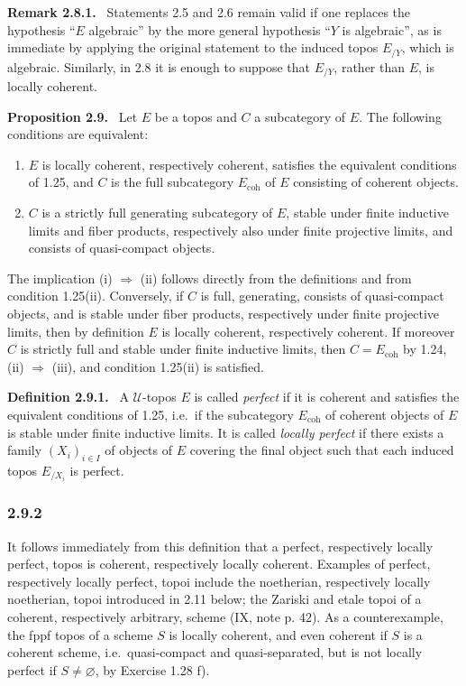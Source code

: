 \documentclass[11pt]{article}
\newcommand{\U}{\mathcal{U}}
\newcommand{\coh}{\mathrm{coh}}
\newcommand{\ie}{i.e.\ }
\newenvironment{statement}[1]{\par\medskip\noindent\textbf{#1.}\ }{\par\medskip}
\newenvironment{remarktext}[1]{\par\medskip\noindent\textbf{#1.}\ }{\par\medskip}
\begin{document}
\begin{remarktext}{Remark 2.8.1}
Statements 2.5 and 2.6 remain valid if one replaces the hypothesis ``\(E\) algebraic'' by the more general hypothesis ``\(Y\) is algebraic'', as is immediate by applying the original statement to the induced topos \(E_{/Y}\), which is algebraic. Similarly, in 2.8 it is enough to suppose that \(E_{/Y}\), rather than \(E\), is locally coherent.
\end{remarktext}

\begin{statement}{Proposition 2.9}
Let \(E\) be a topos and \(C\) a subcategory of \(E\). The following conditions are equivalent:
\begin{enumerate}[label=(\roman*)]
\item \(E\) is locally coherent, respectively coherent, satisfies the equivalent conditions of 1.25, and \(C\) is the full subcategory \(E_{\coh}\) of \(E\) consisting of coherent objects.
\item \(C\) is a strictly full generating subcategory of \(E\), stable under finite inductive limits and fiber products, respectively also under finite projective limits, and consists of quasi-compact objects.
\end{enumerate}
\end{statement}

The implication (i) \(\Rightarrow\) (ii) follows directly from the definitions and from condition 1.25(ii). Conversely, if \(C\) is full, generating, consists of quasi-compact objects, and is stable under fiber products, respectively under finite projective limits, then by definition \(E\) is locally coherent, respectively coherent. If moreover \(C\) is strictly full and stable under finite inductive limits, then \(C=E_{\coh}\) by 1.24, (ii) \(\Rightarrow\) (iii), and condition 1.25(ii) is satisfied.

\begin{statement}{Definition 2.9.1}
A \(\U\)-topos \(E\) is called \emph{perfect} if it is coherent and satisfies the equivalent conditions of 1.25, \ie if the subcategory \(E_{\coh}\) of coherent objects of \(E\) is stable under finite inductive limits. It is called \emph{locally perfect} if there exists a family \((X_i)_{i\in I}\) of objects of \(E\) covering the final object such that each induced topos \(E_{/X_i}\) is perfect.
\end{statement}

\subsubsection*{2.9.2}
It follows immediately from this definition that a perfect, respectively locally perfect, topos is coherent, respectively locally coherent. Examples of perfect, respectively locally perfect, topoi include the noetherian, respectively locally noetherian, topoi introduced in 2.11 below; the Zariski and etale topoi of a coherent, respectively arbitrary, scheme (IX, note p. 42). As a counterexample, the fppf topos of a scheme \(S\) is locally coherent, and even coherent if \(S\) is a coherent scheme, \ie quasi-compact and quasi-separated, but is not locally perfect if \(S\neq\varnothing\), by Exercise 1.28 f).
\end{document}
